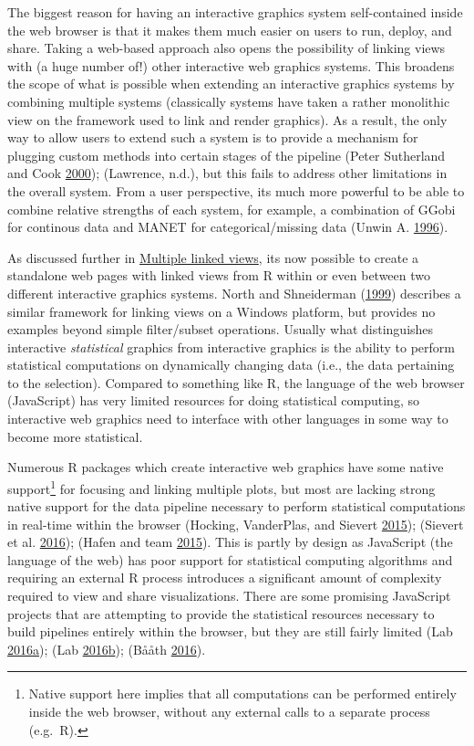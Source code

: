 \documentclass[12pt,]{isuthesis}
\let\rmarkdownfootnote\footnote%
\def\footnote{\protect\rmarkdownfootnote}
\begin{document}
The biggest reason for having an interactive graphics system
self-contained inside the web browser is that it makes them much easier
on users to run, deploy, and share. Taking a web-based approach also
opens the possibility of linking views with (a huge number of!) other
interactive web graphics systems. This broadens the scope of what is
possible when extending an interactive graphics systems by combining
multiple systems (classically systems have taken a rather monolithic
view on the framework used to link and render graphics). As a result,
the only way to allow users to extend such a system is to provide a
mechanism for plugging custom methods into certain stages of the
pipeline (Peter Sutherland and Cook \protect\hyperlink{ref-orca}{2000});
(Lawrence, n.d.), but this fails to address other limitations in the
overall system. From a user perspective, its much more powerful to be
able to combine relative strengths of each system, for example, a
combination of GGobi for continous data and MANET for
categorical/missing data (Unwin A. \protect\hyperlink{ref-MANET}{1996}).

As discussed further in
\protect\hyperlink{multiple-linked-views}{Multiple linked views}, its
now possible to create a standalone web pages with linked views from R
within or even between two different interactive graphics systems. North
and Shneiderman (\protect\hyperlink{ref-North:1999vi}{1999}) describes a
similar framework for linking views on a Windows platform, but provides
no examples beyond simple filter/subset operations. Usually what
distinguishes interactive \emph{statistical} graphics from interactive
graphics is the ability to perform statistical computations on
dynamically changing data (i.e., the data pertaining to the selection).
Compared to something like R, the language of the web browser
(JavaScript) has very limited resources for doing statistical computing,
so interactive web graphics need to interface with other languages in
some way to become more statistical.

Numerous R packages which create interactive web graphics have some
native support\footnote{Native support here implies that all
  computations can be performed entirely inside the web browser, without
  any external calls to a separate process (e.g.~R).} for focusing and
linking multiple plots, but most are lacking strong native support for
the data pipeline necessary to perform statistical computations in
real-time within the browser (Hocking, VanderPlas, and Sievert
\protect\hyperlink{ref-animint}{2015}); (Sievert et al.
\protect\hyperlink{ref-plotly}{2016}); (Hafen and team
\protect\hyperlink{ref-rbokeh}{2015}). This is partly by design as
JavaScript (the language of the web) has poor support for statistical
computing algorithms and requiring an external R process introduces a
significant amount of complexity required to view and share
visualizations. There are some promising JavaScript projects that are
attempting to provide the statistical resources necessary to build
pipelines entirely within the browser, but they are still fairly limited
(Lab
\protect\hyperlink{ref-datalib}{2016}\protect\hyperlink{ref-datalib}{a});
(Lab
\protect\hyperlink{ref-vega-dataflow}{2016}\protect\hyperlink{ref-vega-dataflow}{b});
(Bååth \protect\hyperlink{ref-bayes-js}{2016}).
\end{document}
